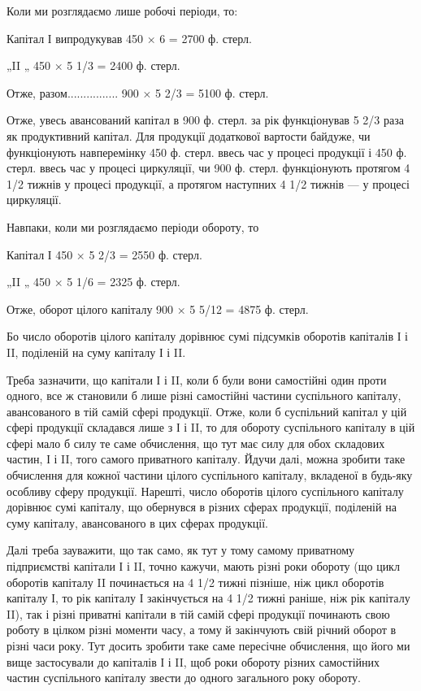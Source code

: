 Коли ми розглядаємо лише робочі періоди, то:

Капітал І випродукував 450 × 6 = 2700 ф. стерл.

„II „ 450 × 5 1/3 = 2400 ф. стерл.

Отже, разом................ 900 × 5 2/3 = 5100 ф. стерл.

Отже, увесь авансований капітал в 900 ф. стерл. за рік функціонував
5 2/3 раза як продуктивний капітал. Для продукції додаткової вартости
байдуже, чи функціонують навперемінку 450 ф. стерл. ввесь час у процесі
продукції і 450 ф. стерл. ввесь час у процесі циркуляції, чи 900 ф.
стерл. функціонують протягом 4 1/2 тижнів у процесі продукції, а протягом
наступних 4 1/2 тижнів — у процесі циркуляції.

Навпаки, коли ми розглядаємо періоди обороту, то

Капітал І 450 × 5 2/3 = 2550 ф. стерл.

„II „ 450 × 5 1/6 = 2325 ф. стерл.

Отже, оборот цілого капіталу 900 × 5 5/12 = 4875 ф. стерл.

Бо число оборотів цілого капіталу дорівнює сумі підсумків оборотів капіталів
І і II, поділеній на суму капіталу І і II.

Треба зазначити, що капітали І і II, коли б були вони самостійні
один проти одного, все ж становили б лише різні самостійні частини суспільного
капіталу, авансованого в тій самій сфері продукції. Отже, коли б
суспільний капітал у цій сфері продукції складався лише з І і II, то для
обороту суспільного капіталу в цій сфері мало б силу те саме обчислення,
що тут має силу для обох складових частин, І і II, того самого
приватного капіталу. Йдучи далі, можна зробити таке обчислення для
кожної частини цілого суспільного капіталу, вкладеної в будь-яку особливу
сферу продукції. Нарешті, число оборотів цілого суспільного капіталу
дорівнює сумі капіталу, що обернувся в різних сферах продукції,
поділеній на суму капіталу, авансованого в цих сферах продукції.

Далі треба зауважити, що так само, як тут у тому самому приватному
підприємстві капітали І і II, точно кажучи, мають різні роки обороту
(що цикл оборотів капіталу II починається на 4 1/2 тижні пізніше, ніж
цикл оборотів капіталу І, то рік капіталу І закінчується на 4 1/2 тижні
раніше, ніж рік капіталу II), так і різні приватні капітали в тій самій
сфері продукції починають свою роботу в цілком різні моменти часу,
а тому й закінчують свій річний оборот в різні часи року. Тут досить
зробити таке саме пересічне обчислення, що його ми вище застосували
до капіталів І і II, щоб роки обороту різних самостійних частин суспільного
капіталу звести до одного загального року обороту.

